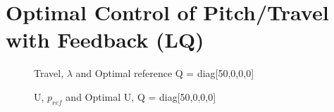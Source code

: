 \documentclass[11pt, a4paper, USenglish]{article} %
\newlength{\figureheight}
\newlength{\figurewidth}
\begin{document}
\section{Optimal Control of Pitch/Travel with Feedback (LQ)} %
\label{sec:optimal_control_of_pitch_travel_with_feedback_lq_}
\begin{figure}[H] 
        \centering
        \setlength{\figureheight}{6cm}
        \setlength{\figurewidth}{10cm}
        
        \caption{Travel, \(\lambda\) and Optimal reference Q = diag[50,0,0,0]} 
\label{fig:ex3_travel} 
\end{figure}    

\begin{figure}[H] 
        \centering
        \setlength{\figureheight}{6cm}
        \setlength{\figurewidth}{10cm}
        
        \caption{U, \(p_{ref}\) and Optimal U, Q = diag[50,0,0,0]} 
\label{fig:ex3_u} 
\end{figure} 
\end{document}
